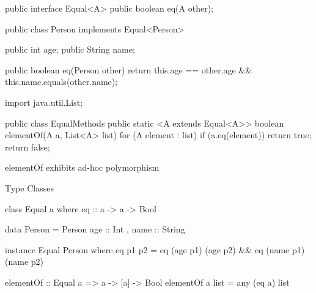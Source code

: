 \documentclass[usenames,dvipsnames,svgnames,table,aspectratio=169,mathserif]{beamer}
\newcommand{\nl}{\vspace{\baselineskip}}
\newcommand{\pnl}{\pause \nl}
\begin{document}
\begin{frame}[fragile]
\begin{javacode}
public interface Equal<A> {
  public boolean eq(A other);
}
\end{javacode}

\pause

\begin{javacode}
public class Person implements Equal<Person> {
  public int age;
  public String name;

  public boolean eq(Person other) {
    return this.age == other.age && this.name.equals(other.name);
  }
}
\end{javacode}
\end{frame}



\begin{frame}[fragile]
\begin{javacode}
import java.util.List;

public class EqualMethods {
  public static <A extends Equal<A>> boolean elementOf(A a, List<A> list) {
    for (A element : list) {
      if (a.eq(element)) return true;
    }
    return false;
  }
}
\end{javacode}

elementOf exhibits ad-hoc polymorphism

\end{frame}


\begin{frame}
\begin{center}
\huge{Type Classes}
\end{center}
\end{frame}


\begin{frame}[fragile]
\begin{haskellcode}
class Equal a where
  eq :: a -> a -> Bool
\end{haskellcode}

\pnl

\begin{haskellcode}
data Person = Person {
  age :: Int
, name :: String
}
\end{haskellcode}

\pnl

\begin{haskellcode}
instance Equal Person where
  eq p1 p2 = eq (age p1) (age p2) && eq (name p1) (name p2)
\end{haskellcode}

\end{frame}


\begin{frame}[fragile]
\begin{haskellcode}
elementOf :: Equal a => a -> [a] -> Bool
elementOf a list = any (eq a) list
\end{haskellcode}
\end{frame}
\end{document}
